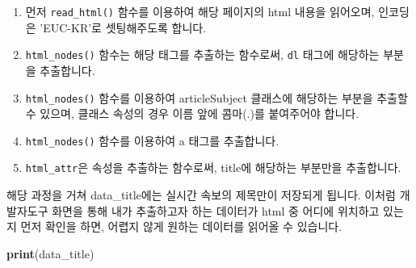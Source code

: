\documentclass[]{book}
\newenvironment{Shaded}{\begin{snugshade}}{\end{snugshade}}
\newcommand{\KeywordTok}[1]{\textcolor[rgb]{0.13,0.29,0.53}{\textbf{#1}}}
\newcommand{\NormalTok}[1]{#1}
\providecommand{\tightlist}{%
  \setlength{\itemsep}{0pt}\setlength{\parskip}{0pt}}
\begin{document}
\begin{enumerate}
\def\labelenumi{\arabic{enumi}.}
\tightlist
\item
  먼저 \texttt{read\_html()} 함수를 이용하여 해당 페이지의 html 내용을 읽어오며, 인코딩은 'EUC-KR'로 셋팅해주도록 합니다.
\item
  \texttt{html\_nodes()} 함수는 해당 태그를 추출하는 함수로써, \texttt{dl} 태그에 해당하는 부분을 추출합니다.
\item
  \texttt{html\_nodes()} 함수를 이용하여 articleSubject 클래스에 해당하는 부분을 추출할 수 있으며, 클래스 속성의 경우 이름 앞에 콤마(.)를 붙여주어야 합니다.
\item
  \texttt{html\_nodes()} 함수를 이용하여 a 태그를 추출합니다.
\item
  \texttt{html\_attr}은 속성을 추출하는 함수로써, title에 해당하는 부분만을 추출합니다.
\end{enumerate}

해당 과정을 거쳐 data\_title에는 실시간 속보의 제목만이 저장되게 됩니다. 이처럼 개발자도구 화면을 통해 내가 추출하고자 하는 데이터가 html 중 어디에 위치하고 있는지 먼저 확인을 하면, 어렵지 않게 원하는 데이터를 읽어올 수 있습니다.

\begin{Shaded}
\begin{Highlighting}[]
\KeywordTok{print}\NormalTok{(data_title)}
\end{Highlighting}
\end{Shaded}
\end{document}
